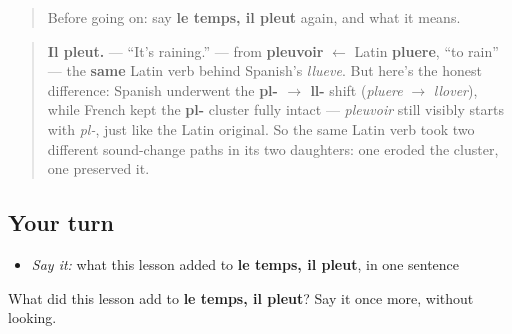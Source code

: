 \begin{quote}
Before going on: say \textbf{le temps, il pleut} again, and what it means.
\end{quote}

\begin{cousinweb}
\begin{quote}
\textbf{Il pleut.} — \textquotedblleft{}It's raining.\textquotedblright{} — from \textbf{pleuvoir} $\leftarrow$ Latin \textbf{pluere}, \textquotedblleft{}to rain\textquotedblright{} — the \textbf{same} Latin verb behind Spanish's \emph{llueve}. But here's the honest difference: Spanish underwent the \textbf{pl- $\to$ ll-} shift (\emph{pluere} $\to$ \emph{llover}), while French kept the \textbf{pl-} cluster fully intact — \emph{pleuvoir} still visibly starts with \emph{pl-}, just like the Latin original. So the same Latin verb took two different sound-change paths in its two daughters: one eroded the cluster, one preserved it.
\end{quote}
\end{cousinweb}

\subsection*{Your turn}
\begin{itemize}
\raggedright
  \item \emph{Say it:} what this lesson added to \textbf{le temps, il pleut}, in one sentence
\end{itemize}

\begin{tcolorbox}[breakable,colback=teal!4,colframe=teal!35!black,title={Before you move on}]
What did this lesson add to \textbf{le temps, il pleut}? Say it once more, without looking.
\end{tcolorbox}
